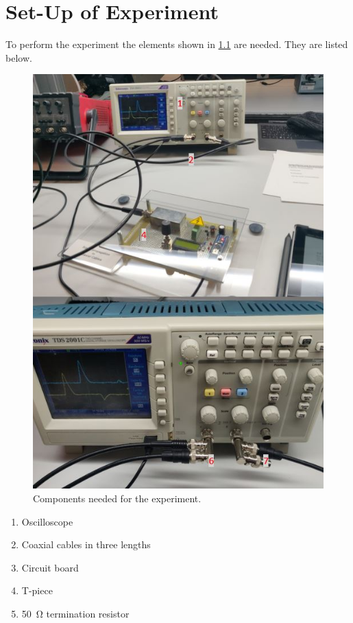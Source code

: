 \chapter{Set-Up of Experiment}
    To perform the experiment the elements shown in \cref{fig:setup} are needed. They are listed below.
    \begin{figure}[h]
        \centering
            \includegraphics[width=.6\textwidth]{aufbau/setup_num.JPG}
        \caption{Components needed for the experiment.}  
        \label{fig:setup}
    \end{figure}
    \begin{enumerate}
        \item Oscilloscope
        \item Coaxial cables in three lengths
        \item Circuit board
        \item T-piece
        \item \SI{50}{\ohm} termination resistor
    \end{enumerate}
